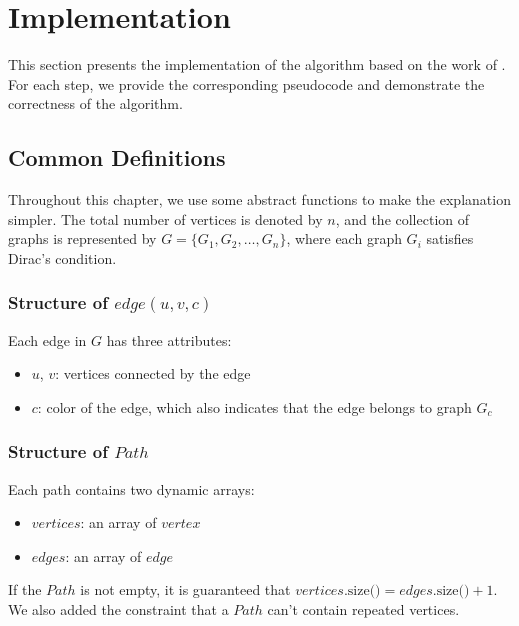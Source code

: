 
\chapter{Implementation}

This section presents the implementation of the algorithm based on the work of \cite{Joos_2020}. For each step, we provide the corresponding pseudocode and demonstrate the correctness of the algorithm.

\section{Common Definitions}

Throughout this chapter, we use some abstract functions to make the explanation simpler. The total number of vertices is denoted by $n$, and the collection of graphs is represented by $G = \{G_1, G_2, \dots, G_n\}$, where each graph $G_i$ satisfies Dirac's condition.

\subsection{Structure of $edge(u, v, c)$}

Each edge in $G$ has three attributes:

\begin{itemize}
    \item $u$, $v$: vertices connected by the edge
    \item $c$: color of the edge, which also indicates that the edge belongs to graph $G_c$
\end{itemize}

\subsection{Structure of $Path$}

Each path contains two dynamic arrays:

\begin{itemize}
    \item $vertices$: an array of $vertex$
    \item $edges$: an array of $edge$
\end{itemize}

If the $Path$ is not empty, it is guaranteed that 
$vertices\text{.size()} = edges\text{.size()} + 1$. We 
also added the constraint that a $Path$ can't contain repeated 
vertices.

